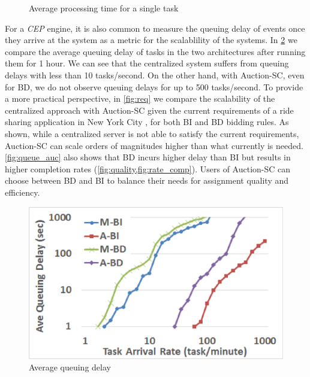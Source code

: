 \begin{figure}[h]
{    }
    \vspace{-0.15in}
    \caption{Average processing time for a single task}
    \label{fig:runtime}
\end{figure}

For a \emph{CEP} engine, it is also common to measure the queuing delay of events \cite{Wu06} once they arrive at the system as a metric for the scalablility of the systems. In \cref{fig:queue} we compare the average queuing delay of tasks in the two architectures after running them for 1 hour. We can see that the centralized system suffers from queuing delays with less than 10 tasks/second. On the other hand, with Auction-SC, even for BD, we do not observe queuing delays for up to 500 tasks/second. To provide a more practical perspective, in \cref{fig:req} we compare the scalability of the centralized approach with Auction-SC given the current requirements of a ride sharing application in New York City \cite{NYCTaxi}, for both BI and BD bidding rules. As shown, while a centralized server is not able to satisfy the current requirements, Auction-SC can scale orders of magnitudes higher than what currently is needed. \cref{fig:queue_auc} also shows that BD incurs higher delay than BI but results in higher completion rates (\cref{fig:quality,fig:rate_comp}). Users of Auction-SC can choose between BD and BI to balance their needs for assignment quality and efficiency.

\begin{figure}[h]
	\centering
	\includegraphics[width = 0.75\columnwidth]{figures/queue.eps}
	\vspace{-0.1in}
	\caption{Average queuing delay}\label{fig:queue}
\end{figure}

